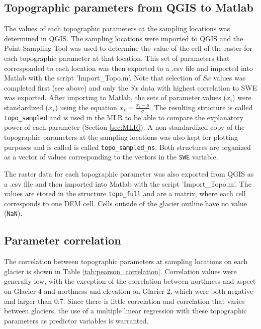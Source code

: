 \documentclass[12pt]{article}
\begin{document}
\begin{enumerate}
\end{enumerate}

\subsection{Topographic parameters from QGIS to Matlab}

The values of each topographic parameters at the sampling locations was determined in QGIS. The sampling locations were imported to QGIS and the Point Sampling Tool was used to determine the value of the cell of the raster for each topographic parameter at that location. This set of parameters that corresponded to each location was then exported to a .csv file and imported into Matlab with the script 'Import\_Topo.m'.  Note that selection of $Sx$ values was completed first (see above) and only the $Sx$ data with highest correlation to SWE was exported. After importing to Matlab, the sets of parameter values ($x_i$) were standardized ($x_s$) using the equation $x_s = \frac{x_i-\mu}{\sigma}$. The resulting structure is called \texttt{topo\_sampled} and is used in the MLR to be able to compare the explanatory power of each parameter (Section \ref{sec:MLR}). A non-standardized copy of the topographic parameters at the sampling locations was also kept for plotting purposes and is called is called \texttt{topo\_sampled\_ns}. Both structures are organized as a vector of values corresponding to the vectors in the \texttt{SWE} variable. 

The raster data for each topographic parameter was also exported from QGIS as a .csv file and then imported into Matlab with the script 'Import\_Topo.m'. The values are stored in the structure \texttt{topo\_full} and are a matrix, where each cell corresponds to one DEM cell. Cells outside of the glacier outline have no value (\texttt{NaN}).

\subsection{Parameter correlation}

The correlation between topographic parameters at sampling locations on each glacier is shown in Table \ref{tab:pearson_correlation}. Correlation values were generally low, with the exception of the correlation between northness and aspect on Glacier 4 and northness and elevation on Glacier 2, which were both negative and larger than 0.7. Since there is little correlation and correlation that varies between glaciers, the use of a multiple linear regression with these topographic parameters as predictor variables is warranted. 
\end{document}
